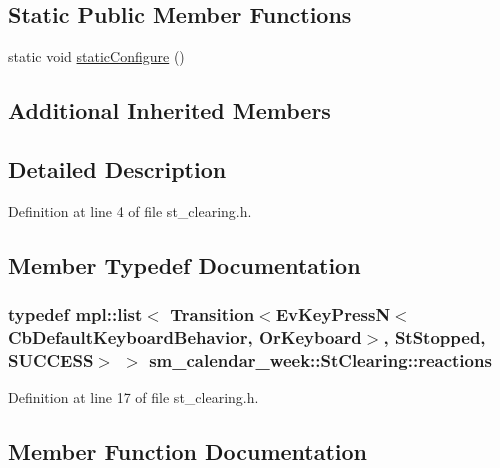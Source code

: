 \subsection*{Static Public Member Functions}
\begin{DoxyCompactItemize}
\item 
static void \hyperlink{structsm__calendar__week_1_1StClearing_a4054080917fc140090f319e4714dd576}{static\+Configure} ()
\end{DoxyCompactItemize}
\subsection*{Additional Inherited Members}


\subsection{Detailed Description}


Definition at line 4 of file st\+\_\+clearing.\+h.



\subsection{Member Typedef Documentation}
\subsubsection[{\texorpdfstring{reactions}{reactions}}]{\setlength{\rightskip}{0pt plus 5cm}typedef mpl\+::list$<$ Transition$<$Ev\+Key\+PressN$<$Cb\+Default\+Keyboard\+Behavior, {\bf Or\+Keyboard}$>$, {\bf St\+Stopped}, {\bf S\+U\+C\+C\+E\+SS}$>$ $>$ {\bf sm\+\_\+calendar\+\_\+week\+::\+St\+Clearing\+::reactions}}\hypertarget{structsm__calendar__week_1_1StClearing_a644d912119d8cd0563e897460f824bd5}{}\label{structsm__calendar__week_1_1StClearing_a644d912119d8cd0563e897460f824bd5}


Definition at line 17 of file st\+\_\+clearing.\+h.



\subsection{Member Function Documentation}
